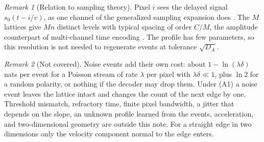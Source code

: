 \documentclass[10pt]{article}
\theoremstyle{remark}
\newtheorem{remark}{Remark}
\begin{document}
\begin{remark}[Relation to sampling theory]
Pixel $i$ sees the delayed signal $s_0(t-i/v)$, as one channel of the generalized sampling
expansion does \cite{papoulis}. The $M$ lattices give $Mn$ distinct levels with typical spacing of
order $C/M$, the amplitude counterpart of multi-channel time encoding \cite{adam}. The profile has
few parameters, so this resolution is not needed to regenerate events at tolerance $\sqrt{D_A}$.
\end{remark}
\begin{remark}[Not covered]
Noise events add their own cost: about $1-\ln(\lambda\delta)$ nats per event for a Poisson stream
of rate $\lambda$ per pixel with $\lambda\delta\ll1$, plus $\ln 2$ for a random polarity, or nothing
if the decoder may drop them. Under (A1) a noise event leaves the lattice intact and changes the count of the next edge
by one. Threshold mismatch, refractory time, finite pixel bandwidth, a jitter that depends on the
slope, an unknown profile learned from the events, acceleration, and two-dimensional geometry are
outside this note. For a straight edge in two dimensions only the velocity component normal to
the edge enters.
\end{remark}
\end{document}
